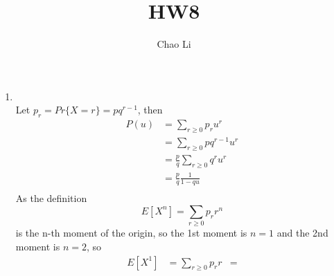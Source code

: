 \documentclass{article}
\title{HW8}
\author{Chao Li}
\begin{document}
\maketitle
\begin{enumerate}
\item \hfill\\
Let \(p_r=Pr\{X=r\}=pq^{r-1}\), then
\begin{align*}
  P(u)&=\sum_{r\geq 0}p_ru^r \\
  &=\sum_{r\geq 0}pq^{r-1}u^r \\
  &=\frac{p}{q}\sum_{r\geq 0}q^ru^r \\
  &=\frac{p}{q}\frac{1}{1-qu} \\
\end{align*}
As the definition \\
\[
E[X^n]=\sum_{r\geq 0}p_rr^n
\]
is the n-th moment of the origin, so the 1st moment is \(n=1\) and the
2nd moment is \(n=2\), so
\begin{align*}
E[X^1]&=\sum_{r\geq 0}p_rr
&=
\end{align*}
\end{enumerate}
\end{document}

